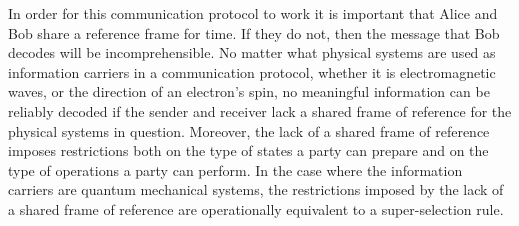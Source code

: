 \documentclass{article}
\newcommand\defn[1]{\textsl{#1}}
\begin{document}
In order for this communication protocol to work it is important that Alice and Bob share a reference frame for time.  If they do not, then the message that Bob decodes will be incomprehensible. No matter what physical systems are used as information carriers in a communication protocol, whether it is  electromagnetic waves, or the direction of an electron's spin, no meaningful information can be reliably decoded if the sender and receiver lack a shared frame of reference for the physical systems in question.  Moreover, the lack of a shared frame of reference imposes restrictions both on the type of states a party can prepare and on the type of operations a party can perform.  In the case where the information carriers are quantum mechanical systems, the restrictions imposed by the lack of a shared frame of reference are operationally equivalent to a super-selection rule.    
%
%
\end{document}
